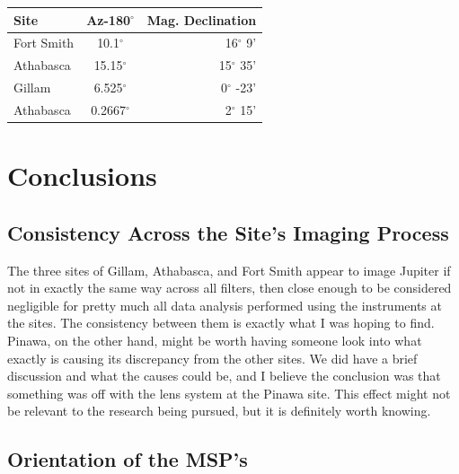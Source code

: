 \documentclass[11pt]{article}
\begin{document}
\begin{center}
\begin{tabular}{| l | c | r| }
\hline
  Site & Az-180$^\circ$ & Mag. Declination \\ \hline
  Fort Smith & 10.1$^\circ$ & 16$^\circ$ 9' \\
  Athabasca & 15.15$^\circ$ & 15$^\circ$ 35' \\
  Gillam & 6.525$^\circ$ & 0$^\circ$ -23' \\
  Athabasca & 0.2667$^\circ$ & 2$^\circ$ 15' \\ \hline
\end{tabular}
\end{center}


\section{Conclusions}
\subsection{Consistency Across the Site's Imaging Process}
\hspace{0.5cm}

The three sites of Gillam, Athabasca, and Fort Smith appear to image Jupiter if not in exactly the same way across all filters, then close enough to be considered negligible for pretty much all data analysis performed using the instruments at the sites. The consistency between them is exactly what I was hoping to find. Pinawa, on the other hand, might be worth having someone look into what exactly is causing its discrepancy from the other sites. We did have a brief discussion and what the causes could be, and I believe the conclusion was that something was off with the lens system at the Pinawa site. This effect might not be relevant to the research being pursued, but it is definitely worth knowing.


\subsection{Orientation of the MSP's}

\hspace{0.5cm}
\end{document}
